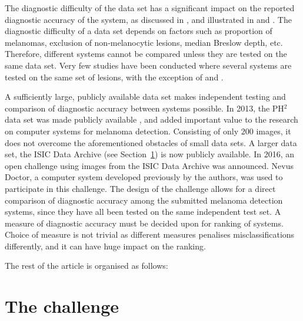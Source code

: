 \documentclass[a4paper,12pt]{article}
\begin{document}
The diagnostic difficulty of the data set has a significant impact on the reported diagnostic accuracy of the system, as discussed in \cite{Rosado2003Accuracy}, and illustrated in \cite{Malvehy2014Clinical} and \cite{Mollersen2015Computeraided}. 
The diagnostic difficulty of a data set depends on factors such as proportion of melanomas, exclusion of non-melanocytic lesions, median Breslow depth, etc. 
Therefore, different systems cannot be compared unless they are tested on the same data set. 
Very few studies have been conducted where several systems are tested on the same set of lesions, with the exception of \cite{Perrinaud2007Can} and \cite{Mollersen2015Computeraided}. 

A sufficiently large, publicly available data set makes independent testing and comparison of diagnostic accuracy between systems possible. 
In 2013, the PH$^2$ data set was made publicly available \citep{Mendonca2013PH2}, and added important value to the research on computer systems for melanoma detection. 
Consisting of only $200$ images, it does not overcome the aforementioned obstacles of small data sets. 
A larger data set, the ISIC Data Archive (see Section~\ref{sec:Challenge}) is now publicly available. 
In 2016, an open challenge using images from the ISIC Data Archive was announced. 
Nevus Doctor, a computer system developed previously by the authors, was used to participate in this challenge.
The design of the challenge allows for a direct comparison of diagnostic accuracy among the submitted melanoma detection systems, since they have all been tested on the same independent test set. 
A measure of diagnostic accuracy must be decided upon for ranking of systems. 
Choice of measure is not trivial as different measures penalises misclassifications differently, and it can have huge impact on the ranking. 

The rest of the article is organised as follows: %

\section{The challenge} \label{sec:Challenge}
\end{document}
